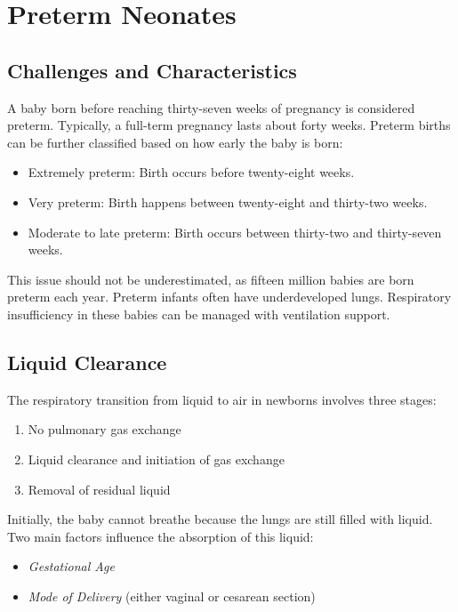 
\section{Preterm Neonates}
\label{sec:preterm_neonates}

\subsection{Challenges and Characteristics}
\label{subsec:challenges_and_characteristics}

A baby born before reaching thirty-seven weeks of pregnancy is
considered preterm. Typically, a full-term pregnancy lasts about forty
weeks.  Preterm births can be further classified based on how early
the baby is born:

\begin{itemize}
\item Extremely preterm: Birth occurs before twenty-eight weeks.
\item Very preterm: Birth happens between twenty-eight and thirty-two weeks.
\item Moderate to late preterm: Birth occurs between thirty-two and thirty-seven weeks.
\end{itemize}

This issue should not be underestimated, as fifteen million babies are
born preterm each year\cite{who2013}.  Preterm infants often have
underdeveloped lungs.  Respiratory insufficiency in these babies can
be managed with ventilation support.

\subsection{Liquid Clearance}
\label{subsec:liquid_clearance}

The respiratory transition from liquid to air in newborns involves
three stages:
\begin{enumerate}
\item No pulmonary gas exchange
\item Liquid clearance and initiation of gas exchange
\item Removal of residual liquid
\end{enumerate}

Initially, the baby cannot breathe because the lungs are still filled
with liquid. Two main factors influence the absorption of this liquid:
\begin{itemize}
\item \emph{Gestational Age}
\item \emph{Mode of Delivery} (either vaginal or cesarean section)
\end{itemize}

